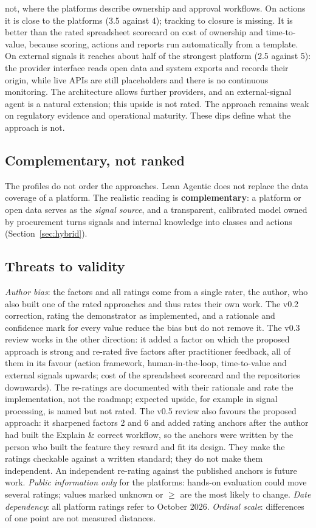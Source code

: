 \documentclass[10pt,twocolumn,a4paper]{article}
\begin{document}
not, where the platforms describe ownership and approval workflows. On
actions it is close to the platforms (3.5 against 4); tracking to closure is missing. It is better than the rated spreadsheet scorecard on cost of
ownership and time-to-value, because scoring, actions and reports run automatically from
a template. On external signals it reaches about half of the strongest platform (2.5
against 5): the provider interface reads open data and system exports and records their
origin, while live APIs are still placeholders and there is no continuous monitoring. The
architecture allows further providers, and an external-signal agent is a natural extension;
this upside is not rated. The approach remains weak on regulatory evidence and operational
maturity. These dips define what the approach is not.

\subsection{Complementary, not ranked}
The profiles do not order the approaches. Lean Agentic does not replace the data
coverage of a platform. The realistic reading is \textbf{complementary}: a platform or
open data serves as the \emph{signal source}, and a transparent, calibrated model owned
by procurement turns signals and internal knowledge into classes and actions
(Section~\ref{sec:hybrid}).

\subsection{Threats to validity}
\label{sec:threats}
\emph{Author bias}: the factors and all ratings come from a single rater, the author, who
also built one of the rated approaches and thus rates their own work. The v0.2 correction, rating the demonstrator as implemented, and a rationale
and confidence mark for every value reduce the bias but do not remove it. The v0.3
review works in the other direction: it added a factor on which the proposed approach is
strong and re-rated five factors after practitioner feedback, all of them in its favour
(action framework, human-in-the-loop, time-to-value and external signals upwards; cost of the
spreadsheet scorecard and the repositories downwards). The re-ratings are documented with their
rationale and rate the implementation, not the roadmap; expected upside, for example in
signal processing, is named but not rated. The v0.5 review also favours the proposed
approach: it sharpened factors 2 and 6 and added rating anchors after the author had built the
Explain \& correct workflow, so the anchors were written by the person who built the feature
they reward and fit its design. They make the ratings checkable against a written standard;
they do not make them independent. An independent re-rating against the published anchors is
future work. \emph{Public information only} for the platforms: hands-on
evaluation could move several ratings; values marked unknown or $\geq$ are the most likely to
change. \emph{Date dependency}: all platform ratings refer
to October 2026. \emph{Ordinal scale}: differences of one point are not measured
distances.
\end{document}

